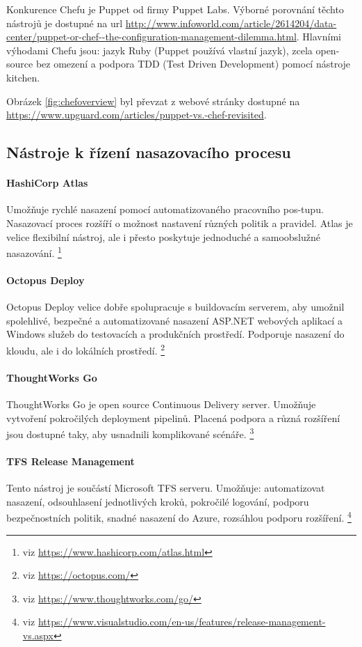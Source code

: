 Konkurence Chefu je Puppet od firmy Puppet Labs. Výborné porovnání těchto nástrojů je dostupné na url \url{http://www.infoworld.com/article/2614204/data-center/puppet-or-chef--the-configuration-management-dilemma.html}. Hlavními výhodami Chefu jsou: jazyk Ruby (Puppet používá vlastní jazyk), zcela open-source bez omezení a podpora TDD (Test Driven Development) pomocí nástroje kitchen.

Obrázek \ref{fig:chefoverview} byl převzat z webové stránky dostupné na \url{https://www.upguard.com/articles/puppet-vs.-chef-revisited}.

\subsection{Nástroje k řízení nasazovacího procesu}
\paragraph{HashiCorp Atlas}
Umožňuje rychlé nasazení pomocí automatizovaného pracovního pos-tupu. Nasazovací proces rozšíří o možnost nastavení různých politik a pravidel. Atlas je velice flexibilní nástroj, ale i přesto poskytuje jednoduché a samoobslužné nasazování. \footnote{viz \url{https://www.hashicorp.com/atlas.html}}

\paragraph{Octopus Deploy}
Octopus Deploy velice dobře spolupracuje s buildovacím serverem, aby umožnil spolehlivé, bezpečné a automatizované nasazení ASP.NET webových aplikací a Windows služeb do testovacích a produkčních prostředí. Podporuje nasazení do kloudu, ale i do lokálních prostředí. \footnote{viz \url{https://octopus.com/}}

\paragraph{ThoughtWorks Go}
ThoughtWorks Go je open source Continuous Delivery server. Umožňuje vytvoření pokročilých deployment pipelinů. Placená podpora a různá rozšíření jsou dostupné taky, aby usnadnili komplikované scénáře. \footnote{viz \url{https://www.thoughtworks.com/go/}}

\paragraph{TFS Release Management}
Tento nástroj je součástí Microsoft TFS serveru. Umožňuje: automatizovat nasazení, odsouhlasení jednotlivých kroků, pokročilé logování, podporu bezpečnostních politik, snadné nasazení do Azure, rozsáhlou podporu rozšíření. \footnote{viz \url{https://www.visualstudio.com/en-us/features/release-management-vs.aspx}}

